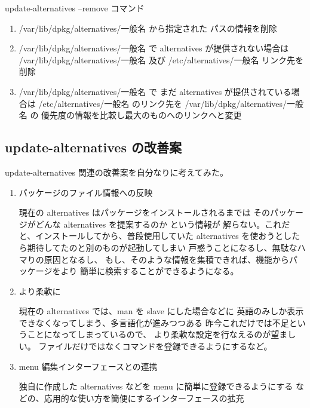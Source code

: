 \documentclass[mingoth]{jsarticle}
\begin{document}
   update-alternatives --remove コマンド

\begin{enumerate}
 \item      /var/lib/dpkg/alternatives/一般名 から指定された パスの情報を削除

 \item      /var/lib/dpkg/alternatives/一般名 で alternatives が提供されない場合は
        /var/lib/dpkg/alternatives/一般名 及び /etc/alternatives/一般名
        リンク先を削除

 \item      /var/lib/dpkg/alternatives/一般名 で まだ alternatives が提供されている場合は
        /etc/alternatives/一般名 のリンク先を /var/lib/dpkg/alternatives/一般名 の
        優先度の情報を比較し最大のものへのリンクへと変更
\end{enumerate}


\subsection{update-alternatives の改善案}

   update-alternatives 関連の改善案を自分なりに考えてみた。


\begin{enumerate}
 \item パッケージのファイル情報への反映
     
      現在の alternatives はパッケージをインストールされるまでは
      そのパッケージがどんな alternatives を提案するのか という情報が
      解らない。これだと、インストールしてから、普段使用していた 
      alternatives を使おうとしたら期待してたのと別のものが起動してしまい
      戸惑うことになるし、無駄なハマりの原因となるし、
      もし、そのような情報を集積できれば、機能からパッケージをより
      簡単に検索することができるようになる。

 \item より柔軟に
      
       現在の alternatives では、man を slave にした場合などに
       英語のみしか表示できなくなってしまう、多言語化が進みつつある
       昨今これだけでは不足ということになってしまっているので、
       より柔軟な設定を行なえるのが望ましい。
       ファイルだけではなくコマンドを登録できるようにするなど。

 \item menu 編集インターフェースとの連携

       独自に作成した alternatives などを menu に簡単に登録できるようにする
       などの、応用的な使い方を簡便にするインターフェースの拡充

\end{enumerate}
\end{document}

